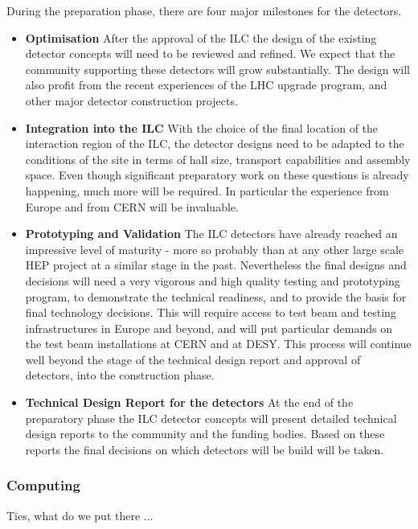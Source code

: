 \documentclass[%
 reprint,
 amsmath,amssymb,
 aps,
]{revtex4-1}
\begin{document}
During the preparation phase, there are four major milestones for the
detectors.
\begin{itemize}

\item{\bfseries Optimisation} After the approval of the ILC the design of the 
existing detector concepts will need to be reviewed and refined. We expect that 
the community supporting these detectors will grow substantially. The design 
will also profit from the recent experiences of the LHC upgrade program, and 
other major detector construction projects. 

\item{\bfseries Integration into the ILC}
With the choice of the final location of the interaction region of the ILC, the 
detector designs need to be adapted to the
conditions of the site in terms of hall size, transport capabilities and
assembly space. Even though significant preparatory work on these questions is 
already happening, much more will be required. In particular the experience from 
Europe and from CERN will be invaluable. 

 
\item{\bfseries Prototyping and Validation}
The ILC detectors have already reached an impressive level of maturity - more so 
probably than at any other large scale HEP project at a similar stage in the 
past. Nevertheless the final designs and decisions will need a very vigorous and 
high quality testing and prototyping program, to demonstrate the technical 
readiness, and to provide the basis for final technology decisions. This will 
require access to test beam and testing infrastructures in Europe and beyond, 
and will put particular demands on the test beam installations at CERN and at 
DESY. This process will continue well beyond the stage of the technical design 
report and approval of detectors, into the construction phase.

\item{\bfseries Technical Design Report for the detectors}
At the end of the preparatory phase the ILC detector concepts will present 
detailed technical design reports to the community and the funding bodies. Based 
on these reports the final decisions on which detectors will be build will be 
taken. 
\end{itemize}

\subsubsection{Computing}
Ties, what do we put there ...
\end{document}
